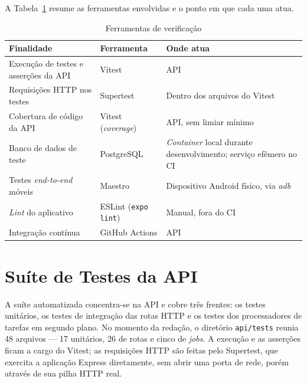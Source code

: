 A Tabela~\ref{tab:test-tooling} resume as ferramentas envolvidas e o ponto em que
cada uma atua.

\begin{table}[H]
\centering
\caption{Ferramentas de verificação}
\label{tab:test-tooling}
\small
\begin{tabular}{|p{4.4cm}|p{4.0cm}|p{5.0cm}|}
\hline
\textbf{Finalidade} &
\textbf{Ferramenta} &
\textbf{Onde atua} \\

\hline

Execução de testes e asserções da API &
Vitest &
API \\

\hline

Requisições HTTP nos testes &
Supertest &
Dentro dos arquivos do Vitest \\

\hline

Cobertura de código da API &
Vitest (\textit{coverage}) &
API, sem limiar mínimo \\

\hline

Banco de dados de teste &
PostgreSQL &
\textit{Container} local durante desenvolvimento; serviço efêmero no CI \\

\hline

Testes \textit{end-to-end} móveis &
Maestro &
Dispositivo Android físico, via \textit{adb} \\

\hline

\textit{Lint} do aplicativo &
ESLint (\texttt{expo lint}) &
Manual, fora do CI \\

\hline

Integração contínua &
GitHub Actions &
API \\

\hline
\end{tabular}
\end{table}

\section{Suíte de Testes da API}\label{sec:test-api}

A suíte automatizada concentra-se na API e cobre três frentes: os testes
unitários, os testes de integração das rotas HTTP e os testes dos processadores
de tarefas em segundo plano. No momento da redação, o diretório
\texttt{api/tests} reunia 48 arquivos --- 17 unitários, 26 de rotas e cinco de
\textit{jobs}. A execução e as asserções ficam a cargo do Vitest; as requisições
HTTP são feitas pelo Supertest, que exercita a aplicação Express diretamente,
sem abrir uma porta de rede, porém através de sua pilha HTTP real.

